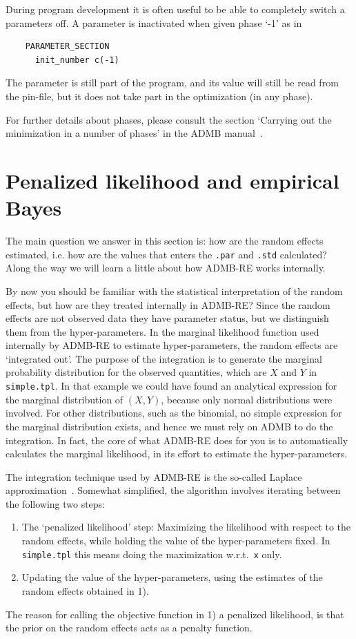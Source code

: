 \documentclass[12pt,letter,reqno]{book}
\begin{document}
During program development it is often useful to be able to completely switch a parameters off. A parameter
is inactivated when given phase `-1' as in
\begin{lstlisting}
    PARAMETER_SECTION
      init_number c(-1)
\end{lstlisting}
The parameter is still part of the program, and
its value will still be read from the pin-file, but it does not take part in the optimization (in any phase).

For further details about phases, please consult the section
`Carrying out the minimization in a number of phases' in the ADMB manual~\cite{admb_manual}.


\section{Penalized likelihood and empirical Bayes\label{sec:hood}}
The main question we answer in this section is: how are the random effects estimated, i.e. how
are the values that enters the \texttt{.par} and  \texttt{.std} calculated? Along the way
we will learn a little about how ADMB-RE works internally.

By now you should be familiar with the statistical interpretation of the random effects, 
but how are they treated internally in ADMB-RE? Since the random effects are not observed data they have parameter status, 
but we distinguish them from the hyper-parameters. In the marginal likelihood function used
internally by ADMB-RE to estimate hyper-parameters, the random effects are `integrated out'. The purpose of the
integration is to generate the marginal probability distribution for the observed quantities, which are $X$ and
$Y$ in \texttt{simple.tpl}. In that example we could have found an analytical expression for the marginal
distribution of $(X,Y)$, because only normal distributions were involved. For other distributions, such as the
binomial, no simple expression for the marginal distribution exists, and hence we must rely on ADMB to do the
integration. In fact, the core of what ADMB-RE does for you is to automatically calculates the marginal
likelihood, in its effort to estimate the hyper-parameters. 

The integration technique used by ADMB-RE is the so-called Laplace approximation~\cite{skaug_fournier1996aam}.
Somewhat simplified, the algorithm involves iterating between the following two steps:

\begin{enumerate}
\item The `penalized likelihood' step: Maximizing the likelihood with
respect to the random effects, while holding the value of the hyper-parameters fixed.
In \texttt{simple.tpl} this means doing the maximization w.r.t.~\texttt{x} only.
\item Updating the value of the hyper-parameters, using the estimates of the
random effects obtained in 1). 
\end{enumerate}
The reason for calling the objective function in 1) a penalized likelihood,
is that the prior on the random effects acts as a penalty function.
\end{document}
